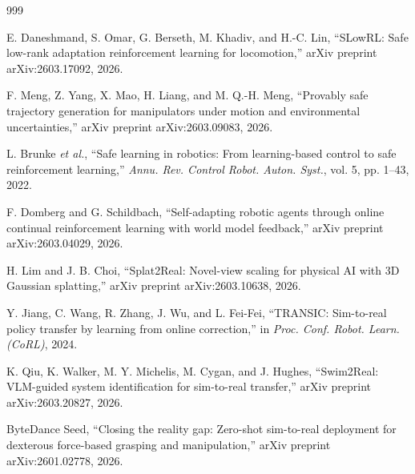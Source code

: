 \documentclass[12pt,a4paper,oneside]{report}
\begin{document}
\begin{thebibliography}{999}

E. Daneshmand, S. Omar, G. Berseth, M. Khadiv, and H.-C. Lin, ``{SLowRL}: Safe low-rank adaptation reinforcement learning for locomotion,'' arXiv preprint arXiv:2603.17092, 2026.




F. Meng, Z. Yang, X. Mao, H. Liang, and M. Q.-H. Meng, ``Provably safe trajectory generation for manipulators under motion and environmental uncertainties,'' arXiv preprint arXiv:2603.09083, 2026.




L. Brunke \textit{et al.}, ``Safe learning in robotics: From learning-based control to safe reinforcement learning,'' \textit{Annu. Rev. Control Robot. Auton. Syst.}, vol. 5, pp. 1--43, 2022.




F. Domberg and G. Schildbach, ``Self-adapting robotic agents through online continual reinforcement learning with world model feedback,'' arXiv preprint arXiv:2603.04029, 2026.




H. Lim and J. B. Choi, ``Splat2Real: Novel-view scaling for physical {AI} with {3D} Gaussian splatting,'' arXiv preprint arXiv:2603.10638, 2026.




Y. Jiang, C. Wang, R. Zhang, J. Wu, and L. Fei-Fei, ``{TRANSIC}: Sim-to-real policy transfer by learning from online correction,'' in \textit{Proc. Conf. Robot. Learn. (CoRL)}, 2024.




K. Qiu, K. Walker, M. Y. Michelis, M. Cygan, and J. Hughes, ``Swim2Real: VLM-guided system identification for sim-to-real transfer,'' arXiv preprint arXiv:2603.20827, 2026.




ByteDance Seed, ``Closing the reality gap: Zero-shot sim-to-real deployment for dexterous force-based grasping and manipulation,'' arXiv preprint arXiv:2601.02778, 2026.




\end{thebibliography}
\end{document}
